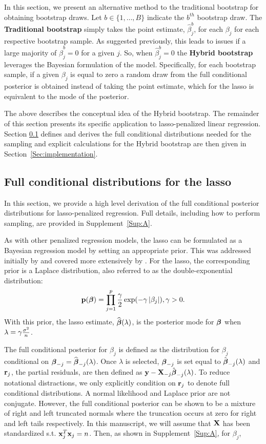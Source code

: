 In this section, we present an alternative method to the traditional bootstrap for obtaining bootstrap draws. Let $b \in \lbrace 1, \ldots, B \rbrace$ indicate the $b^{th}$ bootstrap draw. The \textbf{Traditional bootstrap} simply takes the point estimate, $\hat{\beta}_j^b$, for each $\beta_j$ for each respective bootstrap sample. As suggested previously, this leads to issues if a large majority of $\hat{\beta}_j^b = 0$ for a given $j$. So, when $\hat{\beta}_j^b = 0$ the \textbf{Hybrid bootstrap} leverages the Bayesian formulation of the model. Specifically, for each bootstrap sample, if a given $\beta_j$ is equal to zero a random draw from the full conditional posterior is obtained instead of taking the point estimate, which for the lasso is equivalent to the mode of the posterior. 

The above describes the conceptual idea of the Hybrid bootstrap. The remainder of this section presents its specific application to lasso-penalized linear regression. Section \ref{Sec:full-cond} defines and derives the full conditional distributions needed for the sampling and explicit calculations for the Hybrid bootstrap are then given in Section~\ref{Sec:implementation}.

\subsection{Full conditional distributions for the lasso}
\label{Sec:full-cond}

In this section, we provide a high level derivation of the full conditional posterior distributions for lasso-penalized regression. Full details, including how to perform sampling, are provided in Supplement~\ref{Sup:A}.

As with other penalized regression models, the lasso can be formulated as a Bayesian regression model by setting an appropriate prior. This was addressed initially by \cite{Tibshirani1996} and covered more extensively by \cite{Park2008}. For the lasso, the corresponding prior is a Laplace distribution, also referred to as the double-exponential distribution: $$\mathbf{p}(\boldsymbol{\beta}) = \prod_{j = 1}^{p} \frac{\gamma}{2}\exp(-\gamma \left\lvert\beta_j\right\rvert), \gamma > 0.$$ With this prior, the lasso estimate, $\widehat{\boldsymbol{\beta}}(\lambda)$, is the posterior mode for $\boldsymbol{\beta}$ when $\lambda = \gamma \frac{\sigma^2}{n}$.

The full conditional posterior for $\beta_j$ is defined as the distribution for $\beta_j$ conditional on $\boldsymbol{\beta}_{-j} = \widehat{\boldsymbol{\beta}}_{-j}(\lambda)$. Once $\lambda$ is selected, $\boldsymbol{\beta}_{-j}$ is set equal to $\hat{\boldsymbol{\beta}}_{-j}(\lambda)$ and $\mathbf{r}_{j}$, the partial residuals, are then defined as $\mathbf{y} - \mathbf{X}_{-j}\hat{\boldsymbol{\beta}}_{-j}(\lambda)$. To reduce notational distractions, we only explicitly condition on $\mathbf{r}_{j}$ to denote full conditional distributions. A normal likelihood and Laplace prior are not conjugate. However, the full conditional posterior can be shown to be a mixture of right and left truncated normals where the truncation occurs at zero for right and left tails respectively. In this manuscript, we will assume that $\mathbf{X}$ has been standardized s.t. $\mathbf{x}_j^T\mathbf{x}_j = n$. Then, as shown in Supplement~\ref{Sup:A}, for $\beta_j$,

